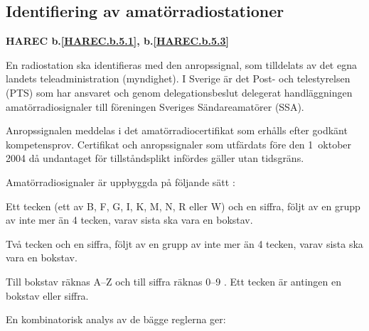 \subsection{Identifiering av amatörradiostationer}
\textbf{
HAREC b.\ref{HAREC.b.5.1}\label{myHAREC.b.5.1},
 b.\ref{HAREC.b.5.3}\label{myHAREC.b.5.3}
}

En radiostation ska identifieras med den anropssignal, som
tilldelats av det egna landets teleadministration (myndighet). I Sverige
är det Post- och telestyrelsen (PTS) som har ansvaret och genom
delegationsbeslut delegerat handläggningen amatörradiosignaler till föreningen Sveriges Sändareamatörer (SSA).

Anropssignalen meddelas i det amatörradiocertifikat som erhålls efter godkänt kompetensprov.
Certifikat och anropssignaler som utfärdats före den 1~oktober 2004 då undantaget för tillståndsplikt infördes gäller utan tidsgräns.

Amatörradiosignaler är uppbyggda på följande sätt \cite[§19.68, §19.69]{ITU-RR}:

Ett tecken (ett av B, F, G, I, K, M, N, R eller W) och en siffra, följt av en
grupp av inte mer än 4 tecken, varav sista ska vara en bokstav.

Två tecken och en siffra, följt av en grupp av inte mer än 4 tecken, varav
sista ska vara en bokstav.

Till bokstav räknas A--Z och till siffra räknas 0--9 \cite[§19.45]{ITU-RR}.
Ett tecken är antingen en bokstav eller siffra.

En kombinatorisk analys av de bägge reglerna ger:


